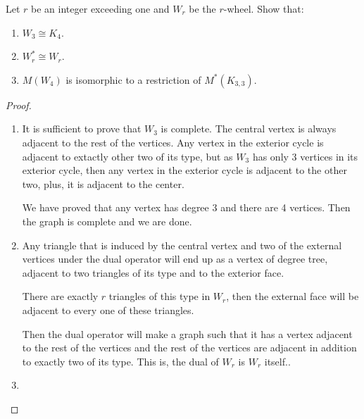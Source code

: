 \prob
{\label{p11}
    Let $r$ be an integer exceeding one and $W_r$ be the $r$-wheel. Show that:
    \begin{enumerate}[label=(\roman*)]
        \item $W_3 \cong K_4$.
        \item $W_r^* \cong W_r$.
        \item $M(W_4)$ is isomorphic to a restriction of $M^*(K_{3,3})$.
    \end{enumerate}
}
\begin{proof}$\,$\pn

    \begin{enumerate}
        \item   It is sufficient to prove that $W_3$ is complete.\pn
                The central vertex is always adjacent to the rest of the vertices.\pn
                Any vertex in the exterior cycle is adjacent to extactly other two of its type, but as $W_3$ has
                only 3 vertices in its exterior cycle, then any vertex in the exterior cycle is adjacent to the other
                two, plus, it is adjacent to the center.\pn
                
                We have proved that any vertex has degree 3 and there are 4 vertices. Then the graph is complete and
                we are done.\pn
                
        \item   Any triangle that is induced by the central vertex and two of the external vertices under the
                dual operator will end up as a vertex of degree tree, adjacent to two triangles of its type and
                to the exterior face.\pn
                
                There are exactly $r$ triangles of this type in $W_r$, then the external face will be adjacent to
                every one of these triangles.\pn
                
                Then the dual operator will make a graph such that it has a vertex adjacent to the rest of the vertices and
                the rest of the vertices are adjacent in addition to exactly two of its type. This is, the dual of 
                $W_r$ is $W_r$ itself.\pn.
                
        \item
                
    \end{enumerate}
\end{proof}